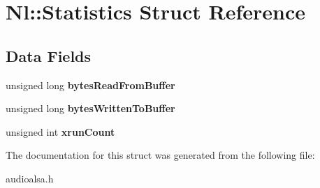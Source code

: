 \hypertarget{structNl_1_1Statistics}{}\section{Nl\+:\+:Statistics Struct Reference}
\label{structNl_1_1Statistics}
\subsection*{Data Fields}
\begin{DoxyCompactItemize}
\item 
\hypertarget{structNl_1_1Statistics_a8a35be265d6a8d155852e7cafe9612cd}{}unsigned long {\bfseries bytes\+Read\+From\+Buffer}\label{structNl_1_1Statistics_a8a35be265d6a8d155852e7cafe9612cd}

\item 
\hypertarget{structNl_1_1Statistics_a2121187feb1650a4d2090a7794e255fe}{}unsigned long {\bfseries bytes\+Written\+To\+Buffer}\label{structNl_1_1Statistics_a2121187feb1650a4d2090a7794e255fe}

\item 
\hypertarget{structNl_1_1Statistics_acfd39cf45715e0ffa49346bba73c347f}{}unsigned int {\bfseries xrun\+Count}\label{structNl_1_1Statistics_acfd39cf45715e0ffa49346bba73c347f}

\end{DoxyCompactItemize}


The documentation for this struct was generated from the following file\+:\begin{DoxyCompactItemize}
\item 
audioalsa.\+h\end{DoxyCompactItemize}
